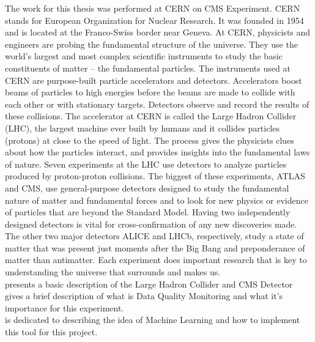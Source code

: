 
The work for this thesis was performed at CERN on CMS Experiment. CERN stands for European Organization for Nuclear Research. It was founded in 1954 and is located at the Franco-Swiss border near Geneva. At CERN, physicists and engineers are probing the fundamental structure of the universe. They use the world's largest and most complex scientific instruments to study the basic constituents of matter – the fundamental particles. The instruments used at CERN are purpose-built particle accelerators and detectors. Accelerators boost beams of particles to high energies before the beams are made to collide with each other or with stationary targets. Detectors observe and record the results of these collisions. The accelerator at CERN is called the Large Hadron Collider (LHC), the largest machine ever built by humans and it collides particles (protons) at close to the speed of light. The process gives the physicists clues about how the particles interact, and provides insights into the fundamental laws of nature. Seven experiments at the LHC use detectors to analyze particles produced by proton-proton collisions. The biggest of these experiments, ATLAS and CMS, use general-purpose detectors designed to study the fundamental nature of matter and fundamental forces and to look for new physics or evidence of particles that are beyond the Standard Model. Having two independently designed detectors is vital for cross-confirmation of any new discoveries made. The other two major detectors ALICE and LHCb, respectively, study a state of matter that was present just moments after the Big Bang and preponderance of matter than antimatter.  Each experiment does important research that is key to understanding the universe that surrounds and makes us.\\

 presents a basic description of the Large Hadron Collider and CMS Detector\\

 gives a brief description of what is Data Quality Monitoring and what it's importance for this experiment. \\

 is dedicated to describing the idea of Machine Learning and how to implement this tool for this project.\\

